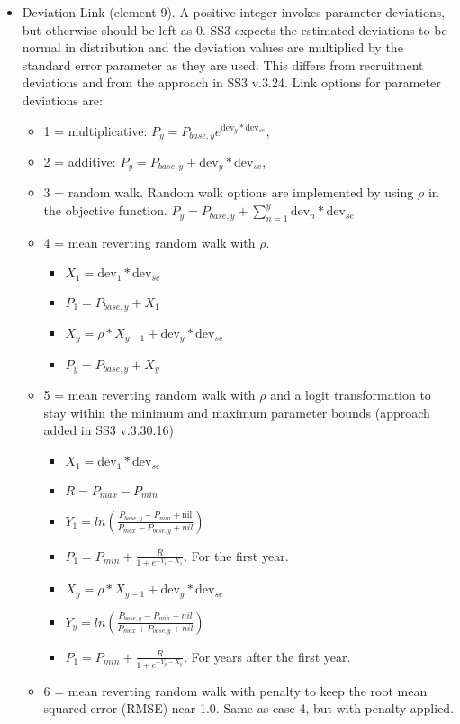 \begin{itemize}
\item Deviation Link (element 9). A positive integer invokes parameter deviations, but otherwise should be left as 0. SS3 expects the estimated deviations to be normal in distribution and the deviation values are multiplied by the standard error parameter as they are used. This differs from recruitment deviations and from the approach in SS3 v.3.24. Link options for parameter deviations are:
	\begin{itemize}
		\item 1 = multiplicative: $P_y = P_{base,y}e^{\text{dev}_y*\text{dev}_{se}}$,
		\item 2 = additive: $P_y = P_{base,y} + \text{dev}_y*\text{dev}_{se}$,
		\item 3 = random walk. Random walk options are implemented by using $\rho$ in the objective function. $P_y = P_{base,y} + \sum_{n=1}^{y} \text{dev}_n*\text{dev}_{se}$
		\item 4 = mean reverting random walk with $\rho$.
		\begin{itemize}
		    \item $X_1 = \text{dev}_1*\text{dev}_{se}$
			\item $P_1 = P_{base,y} + X_1$
			\item $X_y = \rho*X_{y-1} + \text{dev}_y*\text{dev}_{se}$
			\item $P_y = P_{base,y} + X_y$
		\end{itemize}
		\item 5 = mean reverting random walk with $\rho$ and a logit transformation to stay within the minimum and maximum parameter bounds (approach added in SS3 v.3.30.16)
	    \begin{itemize}
		    \item $X_1 = \text{dev}_1*\text{dev}_{se}$
			\item $R = P_{max} - P_{min}$
			\item $Y_1 = ln(\frac{P_{base,y} - P_{min} + \text{nil}}{P_{max} - P_{base,y} + nil})$
			\item $P_1 = P_{min} + \frac{R}{1 + e^{-Y_1 - X_1 }}$. For the first year.
			\item $X_y = \rho*X_{y-1} + \text{dev}_y*\text{dev}_{se}$ 
			\item $Y_y = ln(\frac{P_{base,y} - P_{min} + nil}{P_{max} + P_{base,y} + nil})$
			\item $P_1 = P_{min} + \frac{R}{1 + e^{-Y_y - X_y }}$. For years after the first year.
		\end{itemize}
		\item 6 = mean reverting random walk with penalty to keep the root mean squared error (RMSE) near 1.0. Same as case 4, but with penalty applied.

\end{itemize}
\end{itemize}
